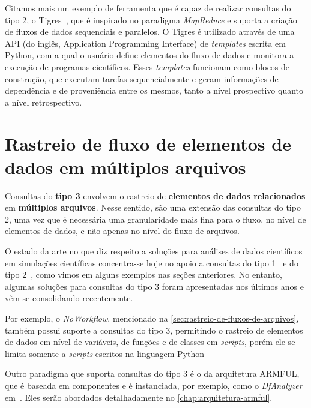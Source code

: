 Citamos mais um exemplo de ferramenta que é capaz de realizar consultas do tipo 2, o Tigres~\cite{hendrix2016tigres}, que é inspirado no paradigma \textit{MapReduce} e suporta a criação de fluxos de dados sequenciais e paralelos. O Tigres é utilizado através de uma  API (do inglês, Application Programming Interface) de \textit{templates} escrita em Python, com a qual o usuário define elementos do fluxo de dados e monitora a execução de programas científicos. Esses \textit{templates} funcionam como blocos de construção, que executam tarefas sequencialmente e geram informações de dependência e de proveniência entre os mesmos, tanto a nível prospectivo quanto a nível retrospectivo.

\section{Rastreio de fluxo de elementos de dados em múltiplos arquivos}%
\label{sec:rastreio-de-elemento-de-dados-em-multiplos-arquivos}

Consultas do \textbf{tipo 3} envolvem o rastreio de \textbf{elementos de dados relacionados} em \textbf{múltiplos arquivos}. Nesse sentido, são uma extensão das consultas do tipo 2, uma vez que é necessária uma granularidade mais fina para o fluxo, no nível de elementos de dados, e não apenas no nível do fluxo de arquivos.

O estado da arte no que diz respeito a soluções para análises de dados científicos em simulações científicas concentra-se hoje no apoio a consultas do tipo 1~\cite{alagiannis2012nodb,karpathiotakis2014adaptive,wu2009fastbit,folk1999hdf5,silva2015propostadoutorado} e do tipo 2~\cite{murta2014noworkflow,mcphillips2015yesworkflow,hendrix2016tigres,Pimentel2016}, como vimos em alguns exemplos nas seções anteriores. No entanto, algumas soluções para consultas do tipo 3 foram apresentadas nos últimos anos e vêm se consolidando recentemente.

Por exemplo, o \textit{NoWorkflow}, mencionado na \autoref{sec:rastreio-de-fluxos-de-arquivos}, também possui suporte a consultas do tipo 3, permitindo o rastreio de elementos de dados em nível de variáveis, de funções e de classes em \textit{scripts}, porém ele se limita somente a \textit{scripts} escritos na linguagem Python~\cite{murta2014noworkflow}

Outro paradigma que suporta consultas do tipo 3 é o da arquitetura ARMFUL, que é baseada em componentes e é instanciada, por exemplo, como o \textit{DfAnalyzer} em~\cite{silva2017raw}. Eles serão abordados detalhadamente no \autoref{chap:arquitetura-armful}.

